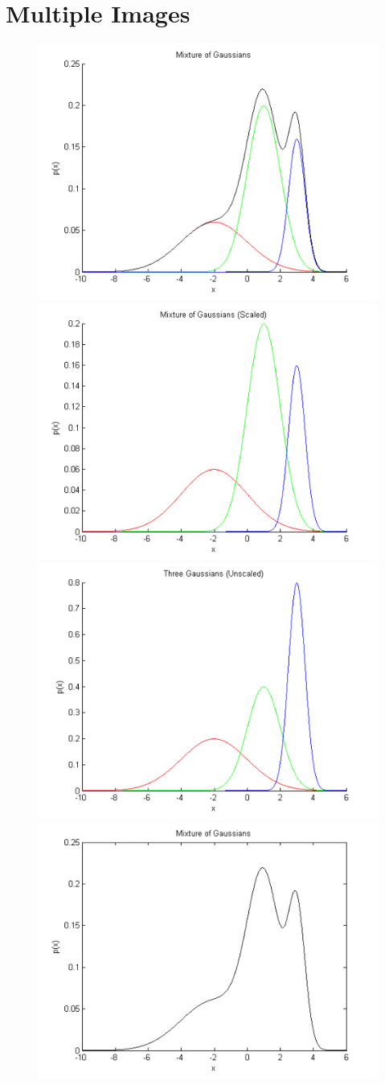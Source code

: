 \documentclass[10pt]{article}
\begin{document}
\section{Multiple Images}
\begin{figure}[H] %
	\centering
\includegraphics[width=0.4\linewidth]{Images/1}
\includegraphics[width=0.4\linewidth]{Images/2}
\includegraphics[width=0.4\linewidth]{Images/3}
\includegraphics[width=0.4\linewidth]{Images/4}
\end{figure}
\end{document}
